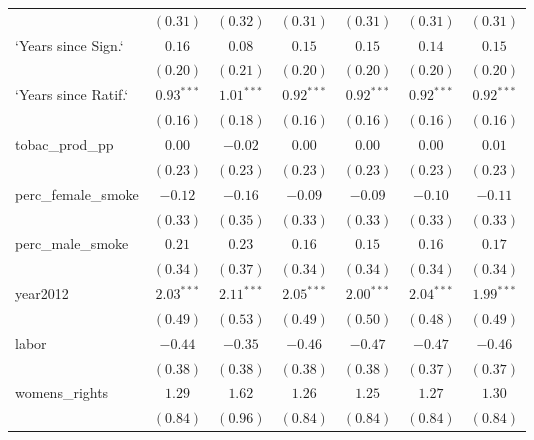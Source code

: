 \begin{table}[!h]
\begin{center}
\begin{tabular}{l c c c c c c }
                        & $(0.31)$     & $(0.32)$     & $(0.31)$     & $(0.31)$     & $(0.31)$     & $(0.31)$     \\
`Years since Sign.`     & $0.16$       & $0.08$       & $0.15$       & $0.15$       & $0.14$       & $0.15$       \\
                        & $(0.20)$     & $(0.21)$     & $(0.20)$     & $(0.20)$     & $(0.20)$     & $(0.20)$     \\
`Years since Ratif.`    & $0.93^{***}$ & $1.01^{***}$ & $0.92^{***}$ & $0.92^{***}$ & $0.92^{***}$ & $0.92^{***}$ \\
                        & $(0.16)$     & $(0.18)$     & $(0.16)$     & $(0.16)$     & $(0.16)$     & $(0.16)$     \\
tobac\_prod\_pp         & $0.00$       & $-0.02$      & $0.00$       & $0.00$       & $0.00$       & $0.01$       \\
                        & $(0.23)$     & $(0.23)$     & $(0.23)$     & $(0.23)$     & $(0.23)$     & $(0.23)$     \\
perc\_female\_smoke     & $-0.12$      & $-0.16$      & $-0.09$      & $-0.09$      & $-0.10$      & $-0.11$      \\
                        & $(0.33)$     & $(0.35)$     & $(0.33)$     & $(0.33)$     & $(0.33)$     & $(0.33)$     \\
perc\_male\_smoke       & $0.21$       & $0.23$       & $0.16$       & $0.15$       & $0.16$       & $0.17$       \\
                        & $(0.34)$     & $(0.37)$     & $(0.34)$     & $(0.34)$     & $(0.34)$     & $(0.34)$     \\
year2012                & $2.03^{***}$ & $2.11^{***}$ & $2.05^{***}$ & $2.00^{***}$ & $2.04^{***}$ & $1.99^{***}$ \\
                        & $(0.49)$     & $(0.53)$     & $(0.49)$     & $(0.50)$     & $(0.48)$     & $(0.49)$     \\
labor                   & $-0.44$      & $-0.35$      & $-0.46$      & $-0.47$      & $-0.47$      & $-0.46$      \\
                        & $(0.38)$     & $(0.38)$     & $(0.38)$     & $(0.38)$     & $(0.37)$     & $(0.37)$     \\
womens\_rights          & $1.29$       & $1.62$       & $1.26$       & $1.25$       & $1.27$       & $1.30$       \\
                        & $(0.84)$     & $(0.96)$     & $(0.84)$     & $(0.84)$     & $(0.84)$     & $(0.84)$     \\

\end{tabular}
\end{center}
\end{table}
